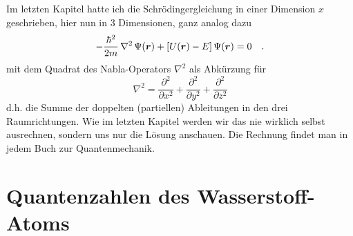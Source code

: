 Im letzten Kapitel hatte ich die Schrödingergleichung in einer Dimension $x$ geschrieben, hier nun in 3 Dimensionen, ganz analog dazu
\begin{equation}
    - \frac{\hbar^2}{2m} \,\nabla^2 \, \Psi(\boldsymbol{r}) + \left[ U(\boldsymbol{r}) - E \right] \Psi(\boldsymbol{r}) = 0 \quad .
    \label{eq:5_SG_3d}
  \end{equation}
mit dem Quadrat des Nabla-Operators $\nabla^2$ als Abkürzung für
\begin{equation}
    \nabla^2 = \frac{\partial^2}{\partial x^2 } + \frac{\partial^2}{\partial y^2 } + 
    \frac{\partial^2}{\partial z^2 } 
\end{equation}
d.h. die Summe der doppelten (partiellen) Ableitungen in den drei Raumrichtungen. Wie im letzten Kapitel werden wir das nie wirklich selbst ausrechnen, sondern uns nur die Lösung anschauen. Die Rechnung findet man in jedem Buch zur Quantenmechanik.

\section{Quantenzahlen des Wasserstoff-Atoms}

